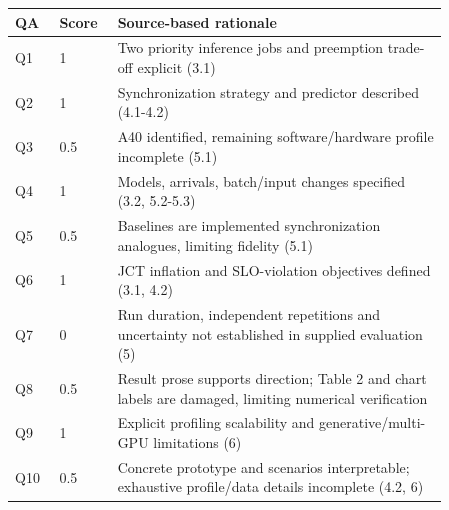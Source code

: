 \begin{longtable}{P{0.09\linewidth}P{0.10\linewidth}P{0.67\linewidth}}
\toprule QA & Score & Source-based rationale\\\midrule\endhead
Q1 & 1 & Two priority inference jobs and preemption trade-off explicit (3.1)\\
Q2 & 1 & Synchronization strategy and predictor described (4.1-4.2)\\
Q3 & 0.5 & A40 identified, remaining software/hardware profile incomplete (5.1)\\
Q4 & 1 & Models, arrivals, batch/input changes specified (3.2, 5.2-5.3)\\
Q5 & 0.5 & Baselines are implemented synchronization analogues, limiting fidelity (5.1)\\
Q6 & 1 & JCT inflation and SLO-violation objectives defined (3.1, 4.2)\\
Q7 & 0 & Run duration, independent repetitions and uncertainty not established in supplied evaluation (5)\\
Q8 & 0.5 & Result prose supports direction; Table 2 and chart labels are damaged, limiting numerical verification\\
Q9 & 1 & Explicit profiling scalability and generative/multi-GPU limitations (6)\\
Q10 & 0.5 & Concrete prototype and scenarios interpretable; exhaustive profile/data details incomplete (4.2, 6)\\
\bottomrule\end{longtable}

